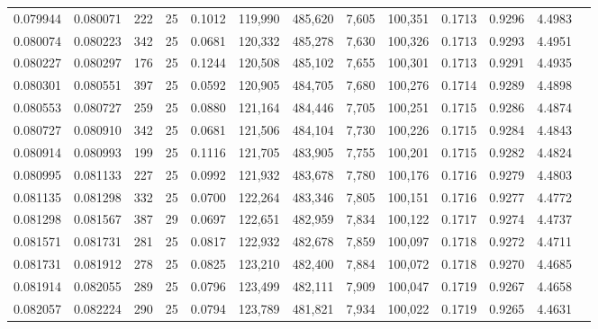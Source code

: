 \begin{tabular}{rrrrrrrrrrrrr}
0.079944 & 0.080071 & 222 &  25 &                                     0.1012 & 119,990 & 485,620 &   7,605 & 100,351 & 0.1713 & 0.9296 & 4.4983 \\
0.080074 & 0.080223 & 342 &  25 &                                     0.0681 & 120,332 & 485,278 &   7,630 & 100,326 & 0.1713 & 0.9293 & 4.4951 \\
0.080227 & 0.080297 & 176 &  25 &                                     0.1244 & 120,508 & 485,102 &   7,655 & 100,301 & 0.1713 & 0.9291 & 4.4935 \\
0.080301 & 0.080551 & 397 &  25 &                                     0.0592 & 120,905 & 484,705 &   7,680 & 100,276 & 0.1714 & 0.9289 & 4.4898 \\
0.080553 & 0.080727 & 259 &  25 &                                     0.0880 & 121,164 & 484,446 &   7,705 & 100,251 & 0.1715 & 0.9286 & 4.4874 \\
0.080727 & 0.080910 & 342 &  25 &                                     0.0681 & 121,506 & 484,104 &   7,730 & 100,226 & 0.1715 & 0.9284 & 4.4843 \\
0.080914 & 0.080993 & 199 &  25 &                                     0.1116 & 121,705 & 483,905 &   7,755 & 100,201 & 0.1715 & 0.9282 & 4.4824 \\
0.080995 & 0.081133 & 227 &  25 &                                     0.0992 & 121,932 & 483,678 &   7,780 & 100,176 & 0.1716 & 0.9279 & 4.4803 \\
0.081135 & 0.081298 & 332 &  25 &                                     0.0700 & 122,264 & 483,346 &   7,805 & 100,151 & 0.1716 & 0.9277 & 4.4772 \\
0.081298 & 0.081567 & 387 &  29 &                                     0.0697 & 122,651 & 482,959 &   7,834 & 100,122 & 0.1717 & 0.9274 & 4.4737 \\
0.081571 & 0.081731 & 281 &  25 &                                     0.0817 & 122,932 & 482,678 &   7,859 & 100,097 & 0.1718 & 0.9272 & 4.4711 \\
0.081731 & 0.081912 & 278 &  25 &                                     0.0825 & 123,210 & 482,400 &   7,884 & 100,072 & 0.1718 & 0.9270 & 4.4685 \\
0.081914 & 0.082055 & 289 &  25 &                                     0.0796 & 123,499 & 482,111 &   7,909 & 100,047 & 0.1719 & 0.9267 & 4.4658 \\
0.082057 & 0.082224 & 290 &  25 &                                     0.0794 & 123,789 & 481,821 &   7,934 & 100,022 & 0.1719 & 0.9265 & 4.4631 \\

\end{tabular}
